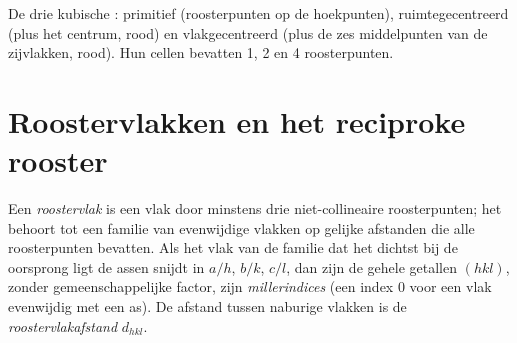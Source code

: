\begin{omfigure}

{\small De drie kubische : primitief (roosterpunten op de
hoekpunten), ruimtegecentreerd (plus het centrum, rood) en vlakgecentreerd
(plus de zes middelpunten van de zijvlakken, rood). Hun cellen bevatten 1,
2 en 4 roosterpunten.}
\end{omfigure}

\section{Roostervlakken en het reciproke rooster}

\begin{definition}\label{def:b3:x-ray-diffraction:miller}
Een \emph{roostervlak} is een vlak door minstens drie
niet-collineaire roosterpunten; het behoort tot een familie van
evenwijdige vlakken op gelijke afstanden die alle roosterpunten bevatten.
Als het vlak van de familie dat het dichtst bij de oorsprong ligt de
assen snijdt in $a/h$, $b/k$, $c/l$, dan zijn de gehele getallen $(hkl)$,
zonder gemeenschappelijke factor, zijn
\emph{millerindices} (een index 0 voor een vlak
evenwijdig met een as). De afstand tussen naburige vlakken is de
\emph{roostervlakafstand} $d_{hkl}$.
\end{definition}

